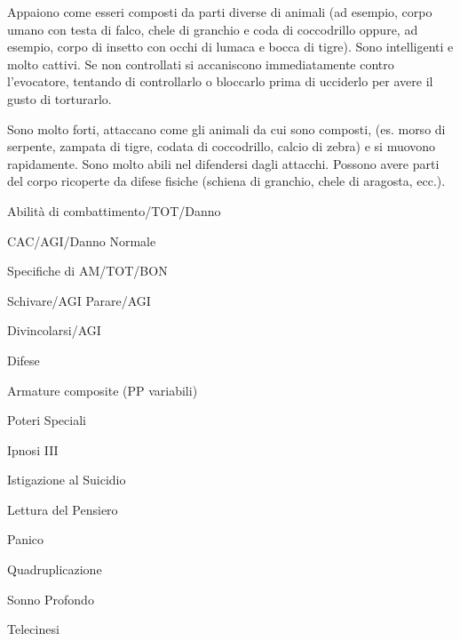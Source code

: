 
Appaiono come esseri composti da parti diverse di animali (ad esempio,
corpo umano con testa di falco, chele di granchio e coda di
coccodrillo oppure, ad esempio, corpo di insetto con occhi di lumaca e
bocca di tigre). Sono intelligenti e molto cattivi. Se non
controllati si accaniscono immediatamente contro l'evocatore, tentando
di controllarlo o bloccarlo prima di ucciderlo per avere il gusto di
torturarlo.


Sono molto forti, attaccano come gli animali da cui sono composti,
(es. morso di serpente, zampata di tigre, codata di coccodrillo,
calcio di zebra) e si muovono rapidamente.  Sono molto abili nel
difendersi dagli attacchi. Possono avere parti del corpo ricoperte da
difese fisiche (schiena di granchio, chele di aragosta, ecc.).




\begin{parmostro}{Abilit\`a di combattimento/TOT/Danno}
\item CAC/AGI/Danno Normale
\end{parmostro}

\begin{parmostro}{Specifiche di AM/TOT/BON}
\item  Schivare/AGI Parare/AGI
\item Divincolarsi/AGI
\end{parmostro}


\begin{parmostro}{Difese}
\item Armature composite (PP variabili)
\end{parmostro}

\begin{parmostro}{Poteri Speciali}
\item Ipnosi III
\item Istigazione al Suicidio
\item Lettura del Pensiero
\item Panico
\item Quadruplicazione
\item Sonno Profondo
\item Telecinesi
\end{parmostro}


